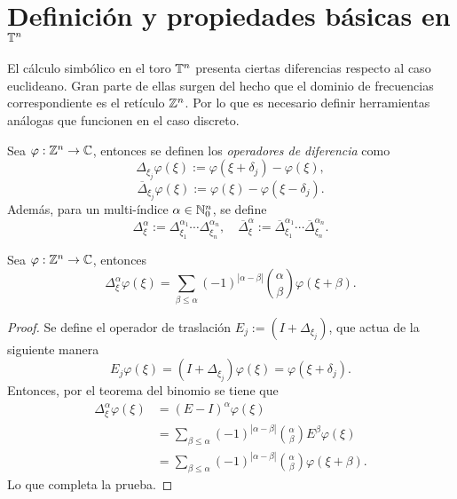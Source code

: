 \section{Definición y propiedades básicas en $\mathbb{T}^n$}
El cálculo simbólico en el toro $\mathbb{T}^n$ presenta ciertas diferencias respecto al caso euclideano. Gran parte de ellas surgen del hecho que el dominio de frecuencias correspondiente es el retículo $\mathbb{Z}^n$. Por lo que es necesario definir herramientas análogas que funcionen en el caso discreto. 
\begin{definition}
	Sea $\varphi:\mathbb{Z}^n\to\mathbb{C}$, entonces se definen los \textit{operadores de diferencia }como 
	\begin{equation*}
		\Delta_{\xi_j} \varphi(\xi) := \varphi(\xi + \delta_j) - \varphi(\xi),
	\end{equation*}
	\begin{equation*}
		\overline{\Delta}_{\xi_j} \varphi(\xi) := \varphi(\xi) - \varphi(\xi - \delta_j).
	\end{equation*}
	Además, para un multi-índice $\alpha\in\mathbb{N}^n_0$, se define 
	\begin{equation*}
		\Delta^\alpha_\xi := \Delta^{\alpha_1}_{\xi_1} \cdots \Delta^{\alpha_n}_{\xi_n}, \quad \overline{\Delta}^\alpha_\xi := \overline{\Delta}^{\alpha_1}_{\xi_1} \cdots \overline{\Delta}^{\alpha_n}_{\xi_n}.
	\end{equation*}
\end{definition}
\begin{proposition}
	Sea $\varphi:\mathbb{Z}^n\to\mathbb{C}$, entonces 
	\begin{equation*}
		\Delta^\alpha_\xi \varphi(\xi) = \sum_{\beta\leq\alpha}(-1)^{|\alpha-\beta|} \binom{\alpha}{\beta}\varphi(\xi+\beta).
	\end{equation*}
\end{proposition}
\begin{proof}
	Se define el operador de traslación $E_j := (I+\Delta_{\xi_j})$, que actua de la siguiente manera
	\begin{equation*}
		E_j\varphi(\xi) = (I+\Delta_{\xi_j})\varphi(\xi) = \varphi(\xi +\delta_j).
	\end{equation*}
	Entonces, por el teorema del binomio se tiene que 
	\begin{align*}
		\Delta^\alpha_\xi\varphi(\xi) & = (E - I)^\alpha\varphi(\xi)\\
		& = \sum_{\beta\leq\alpha}(-1)^{|\alpha-\beta|}\binom{\alpha}{\beta}E^\beta\varphi(\xi) \\
		&  = \sum_{\beta\leq\alpha}(-1)^{|\alpha-\beta|} \binom{\alpha}{\beta}\varphi(\xi+\beta).
	\end{align*}
	Lo que completa la prueba.
\end{proof}
